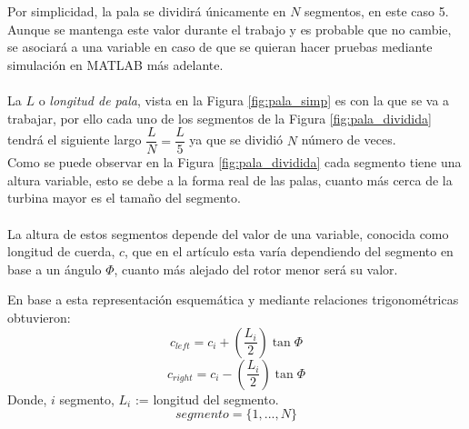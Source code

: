 Por simplicidad, la pala se dividirá únicamente en $N$ segmentos, en este caso 5. Aunque se mantenga este valor durante el trabajo y es probable que no cambie, se asociará a una variable en caso de que se quieran hacer pruebas mediante simulación en MATLAB más adelante. \\\\
    

La $L$ o \textit{longitud de pala}, vista en la Figura \ref{fig:pala_simp} es con la que se va a trabajar, por ello cada uno de los segmentos de la Figura \ref{fig:pala_dividida} tendrá el siguiente largo $\dfrac{L}{N} = \dfrac{L}{5}$ ya que se dividió $N$ número de veces. \\


Como se puede observar en la Figura \ref{fig:pala_dividida} cada segmento tiene una altura variable, esto se debe a la forma real de las palas, cuanto más cerca de la turbina mayor es el tamaño del segmento. \\\\

La altura de estos segmentos depende del valor de una variable, conocida como longitud de cuerda, $c$, que en el artículo \cite[pág 56]{armenta2021predictive} esta varía dependiendo del segmento en base a un ángulo $\varPhi$, cuanto más alejado del rotor menor será su valor. \\

\begin{definicion}
En base a esta representación esquemática y mediante relaciones trigonométricas obtuvieron:
$$ c_{left} = c_i + (\dfrac{L_i}{2}) \tan \varPhi$$
$$ c_{right} = c_i - (\dfrac{L_i}{2}) \tan \varPhi$$
Donde,
\centering $i$ \in segmento, \hspace{7} $L_i$ := longitud del segmento.
$$ segmento = \{1, ..., N\}$$
\label{def:laterales_segmento}
\end{definicion}


